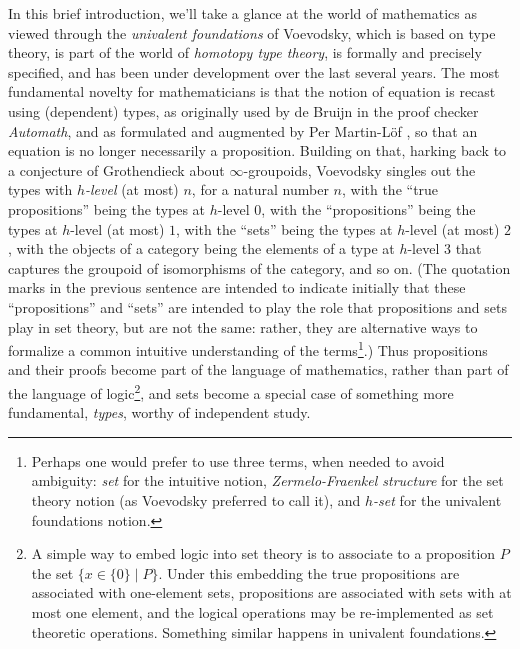 \documentclass[letter,12pt]{amsart}
\theoremstyle{definition}
\theoremstyle{remark}
\numberwithin{equation}{section}
\begin{document}
In this brief introduction, we'll take a glance at the world of mathematics as viewed through the {\em univalent foundations} of Voevodsky,
which is based on type theory, is part of the world of {\em homotopy type theory}, is formally and precisely specified, and has been under
development over the last several years.  The most fundamental novelty for mathematicians is that the notion of equation is recast using
(dependent) types, as originally used by de Bruijn \citep{MR0274219} in the proof checker {\em Automath}, and as formulated and augmented by Per
Martin-L\"of \citep{MLTT79}, so that an equation is no longer necessarily a proposition.  Building on that, harking back to a conjecture of
Grothendieck about $\infty$-groupoids, Voevodsky singles out the types with {\em $h$-level} (at most) $n$, for a natural number $n$, with the ``true
propositions'' being the types at $h$-level $0$, with the ``propositions'' being the types at $h$-level (at most) $1$, with the ``sets'' being the types at
$h$-level (at most) $2$, with the objects of a category being the elements of a type at $h$-level 3 that captures the groupoid of isomorphisms of the category,
and so on.  (The quotation marks in the previous sentence are intended to indicate initially that these ``propositions'' and ``sets'' are
intended to play the role that propositions and sets play in set theory, but are not the same: rather, they are alternative ways to formalize a
common intuitive understanding of the terms\footnote{Perhaps one would prefer to use three terms, when needed to avoid ambiguity: {\em set} for
  the intuitive notion, {\em Zermelo-Fraenkel structure} for the set theory notion (as Voevodsky preferred to call it), and {\em $h$-set} for
  the univalent foundations notion.}.)  Thus propositions and their proofs become part of the language of mathematics, rather than part of the
language of logic\footnote{A simple way to embed logic into set theory is to associate to a proposition $P$ the set $\{x \in \{0\} \mid
  P\}$.  Under this embedding the true propositions are associated with one-element sets, propositions are associated with sets with at most
  one element, and the logical operations may be re-implemented as set theoretic operations.  Something similar happens in univalent foundations.},
and sets become a special case of something more fundamental, {\em types}, worthy of independent study.
\end{document}
